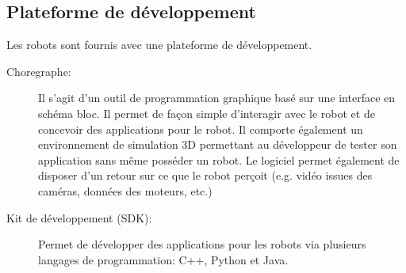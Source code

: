 \subsection{Plateforme de développement}
\label{Entreprise:Les produits: Nao: Plateforme de développement}
Les robots sont fournis avec une plateforme de développement.
\begin{description}
	\item[Choregraphe:] Il s'agit d'un outil de programmation graphique basé sur une interface en schéma bloc. Il permet de façon simple d'interagir avec le robot et de concevoir des applications pour le robot. Il comporte également un environnement de simulation 3D permettant au développeur de tester son application sans même posséder un robot. Le logiciel permet également de disposer d'un retour sur ce que le robot perçoit (e.g. vidéo issues des caméras, données des moteurs, etc.)
	
	\item[Kit de développement (SDK):] Permet de développer des applications pour les robots via plusieurs langages de programmation:  C++, Python et Java.
\end{description}


